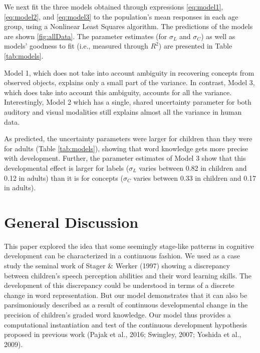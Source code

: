 \documentclass[english,,man]{apa6}
\begin{document}
We next fit the three models obtained through expressions \ref{eq:model1}, \ref{eq:model2}, and \ref{eq:model3} to the population's mean responses in each age group, using a Nonlinear Least Squares algorithm. The predictions of the models are shown \ref{fig:allData}. The parameter estimates (for \(\sigma_L\) and \(\sigma_C\)) as well as models' goodness to fit (i.e., measured through \(R^2\)) are presented in Table \ref{tab:models}.

Model 1, which does not take into account ambiguity in recovering concepts from observed objects, explains only a small part of the variance. In contrast, Model 3, which does take into account this ambiguity, accounts for all the variance. Interestingly, Model 2 which has a single, shared uncertainty parameter for both auditory and visual modalities still explains almost all the variance in human data.

As predicted, the uncertainty parameters were larger for children than they were for adults (Table \ref{tab:models}), showing that word knowledge gets more precise with development. Further, the parameter estimates of Model 3 show that this developmental effect is larger for labels (\(\sigma_L\) varies between 0.82 in children and 0.12 in adults) than it is for concepts (\(\sigma_C\) varies between 0.33 in children and 0.17 in adults).

\hypertarget{general-discussion}{%
\section{General Discussion}\label{general-discussion}}

This paper explored the idea that some seemingly stage-like patterns in cognitive development can be characterized in a continuous fashion. We used as a case study the seminal work of Stager \& Werker (1997) showing a discrepancy between children's speech perception abilities and their word learning skills. The development of this discrepancy could be understood in terms of a discrete change in word representation. But our model demonstrates that it can also be parsimoniously described as a result of continuous developmental change in the precision of children's graded word knowledge. Our model thus provides a computational instantiation and test of the continuous development hypothesis proposed in previous work (Pajak et al., 2016; Swingley, 2007; Yoshida et al., 2009).
\end{document}
